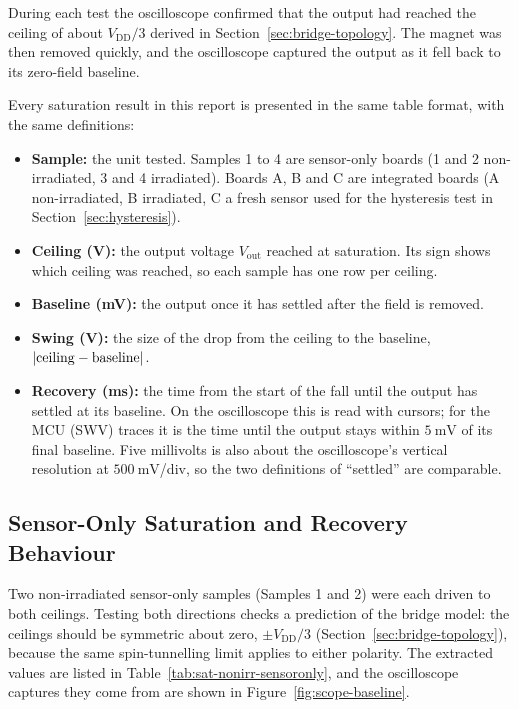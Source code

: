 \documentclass[12pt,a4paper]{article}
\begin{document}
During each test the oscilloscope confirmed that the output had reached the ceiling of about $V_{\text{DD}}/3$ derived in Section~\ref{sec:bridge-topology}. The magnet was then removed quickly, and the oscilloscope captured the output as it fell back to its zero-field baseline.

Every saturation result in this report is presented in the same table format, with the same definitions:
\begin{itemize}
\item \textbf{Sample:} the unit tested. Samples 1 to 4 are sensor-only boards (1 and 2 non-irradiated, 3 and 4 irradiated). Boards A, B and C are integrated boards (A non-irradiated, B irradiated, C a fresh sensor used for the hysteresis test in Section~\ref{sec:hysteresis}).
\item \textbf{Ceiling (V):} the output voltage $V_{\text{out}}$ reached at saturation. Its sign shows which ceiling was reached, so each sample has one row per ceiling.
\item \textbf{Baseline (mV):} the output once it has settled after the field is removed.
\item \textbf{Swing (V):} the size of the drop from the ceiling to the baseline, $|{\rm ceiling} - {\rm baseline}|$.
\item \textbf{Recovery (ms):} the time from the start of the fall until the output has settled at its baseline. On the oscilloscope this is read with cursors; for the MCU (SWV) traces it is the time until the output stays within $\SI{5}{\milli\volt}$ of its final baseline. Five millivolts is also about the oscilloscope's vertical resolution at $\SI{500}{\milli\volt}$/div, so the two definitions of ``settled'' are comparable.
\end{itemize}


\subsection{Sensor-Only Saturation and Recovery Behaviour}
\label{sec:standalone-sat-recovery}

Two non-irradiated sensor-only samples (Samples 1 and 2) were each driven to both ceilings. Testing both directions checks a prediction of the bridge model: the ceilings should be symmetric about zero, $\pm V_{\text{DD}}/3$ (Section~\ref{sec:bridge-topology}), because the same spin-tunnelling limit applies to either polarity. The extracted values are listed in Table~\ref{tab:sat-nonirr-sensoronly}, and the oscilloscope captures they come from are shown in Figure~\ref{fig:scope-baseline}.
\end{document}

